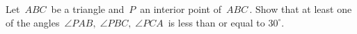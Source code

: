 Let $ \,ABC\,$ be a triangle and $ \,P\,$ an interior point of  $ \,ABC\,$. Show that at least one of the angles $ \,\angle PAB,\;\angle PBC,\;\angle PCA\,$ is less than or equal to $ 30^{\circ }$.